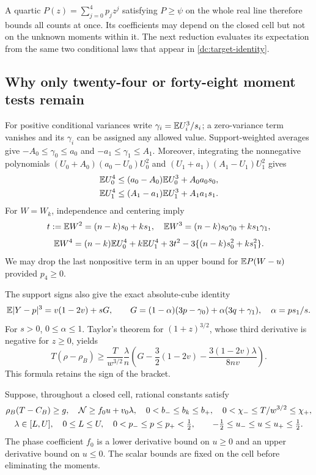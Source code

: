 A quartic $P(z)=\sum_{j=0}^4p_jz^j$ satisfying $P\ge\psi$ on the
whole real line therefore bounds all counts at once. Its coefficients
may depend on the closed cell but not on the unknown moments within it.
The next reduction evaluates its expectation from the same two conditional
laws that appear in \eqref{dc:target-identity}.

\subsection{Why only twenty-four or forty-eight moment tests remain}
\label{dc:corners}
For positive conditional variances write
$\gamma_i=\mathbb E U_i^3/s_i$; a zero-variance term vanishes and its
$\gamma_i$ can be assigned any allowed value. Support-weighted averages
give $-A_0\le\gamma_0\le a_0$ and $-a_1\le\gamma_1\le A_1$.
Moreover, integrating the nonnegative polynomials
$(U_0+A_0)(a_0-U_0)U_0^2$ and
$(U_1+a_1)(A_1-U_1)U_1^2$ gives
\begin{align}\label{dc:fourth}
 \mathbb E U_0^4&\le(a_0-A_0)\mathbb E U_0^3+A_0a_0s_0,\\
 \mathbb E U_1^4&\le(A_1-a_1)\mathbb E U_1^3+A_1a_1s_1.\notag
\end{align}
For $W=W_k$, independence and centering imply
\[
 t:=\mathbb E W^2=(n-k)s_0+ks_1,\quad
 \mathbb E W^3=(n-k)s_0\gamma_0+ks_1\gamma_1,
\]
\[
 \mathbb E W^4=(n-k)\mathbb E U_0^4+k\mathbb E U_1^4+3t^2
                         -3\{(n-k)s_0^2+ks_1^2\}.
\]
We may drop the last nonpositive term in an upper bound for $\mathbb E P(W-u)$
provided $p_4\ge0$.

The support signs also give the exact absolute-cube identity
\begin{equation}\label{dc:cube-exact}
 \mathbb E|Y-p|^3=v(1-2v)+sG,\qquad
 G=(1-\alpha)(3p-\gamma_0)+\alpha(3q+\gamma_1),
 \quad \alpha=ps_1/s.
\end{equation}
For $s>0$, $0\le\alpha\le1$. Taylor's theorem for $(1+z)^{3/2}$,
whose third derivative is negative for $z\ge0$, yields
\begin{equation}\label{dc:cube-lower}
 T(\rho-\rho_B)\ge
 \frac{T}{w^{3/2}}\frac\lambda n
 \left(G-\frac32(1-2v)-\frac{3(1-2v)\lambda}{8nv}\right).
\end{equation}
This formula retains the sign of the bracket.

Suppose, throughout a closed cell, rational constants satisfy
\begin{gather}\label{dc:enclosures}
 \rho_B(T-C_B)\ge g,\quad
 \mathcal N\ge f_0u+v_0\lambda,\quad
 0<b_-\le b_k\le b_+,\quad
 0<\chi_-\le T/w^{3/2}\le \chi_+,\\
 \lambda\in[L,U],\quad 0\le L\le U,\quad
 0<p_-\le p\le p_+<\tfrac12,\qquad
 -\tfrac12\le u_-\le u\le u_+\le\tfrac12.\notag
\end{gather}
The phase coefficient $f_0$ is a lower derivative bound on $u\ge0$ and
an upper derivative bound on $u\le0$. The scalar bounds are fixed on the
cell before eliminating the moments.

